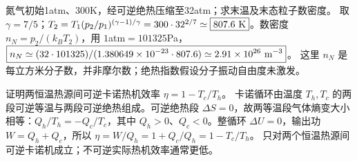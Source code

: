 \problemtext 氮气初始1atm、300K，经可逆绝热压缩至32atm；求末温及末态粒子数密度。
\workings 取 $\gamma=7/5$；$T_2=T_1(p_2/p_1)^{(\gamma-1)/\gamma}=300\cdot32^{2/7}\simeq\boxed{807.6\ {\rm K}}$。数密度 $n_N=p_2/(k_BT_2)$，用 $1$atm$=101325$Pa，$\boxed{n_N\simeq(32\cdot101325)/(1.380649\times10^{-23}\cdot807.6)\simeq2.91\times10^{26}\ {\rm m^{-3}}}$。
\crosscheck 这里 $n_N$ 是每立方米分子数，并非摩尔数；绝热指数假设分子振动自由度未激发。

\problemtext 证明两恒温热源间可逆卡诺热机效率 $\eta=1-T_c/T_h$。
\workings 卡诺循环由温度 $T_h,T_c$ 的两段可逆等温与两段可逆绝热组成。可逆绝热段 $\Delta S=0$，故两等温段气体熵变大小相等：$Q_h/T_h=-Q_c/T_c$，其中 $Q_h>0$、$Q_c<0$。整循环 $\Delta U=0$，输出功 $W=Q_h+Q_c$，所以 $\boxed{\eta=W/Q_h=1+Q_c/Q_h=1-T_c/T_h}$。
\crosscheck 只对两个恒温热源间可逆卡诺机成立；不可逆实际热机效率通常更低。
